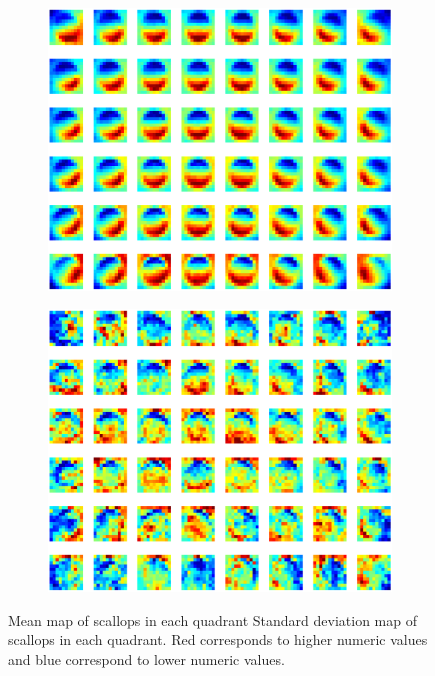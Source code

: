 \documentclass {udthesis}
\begin{document}
\begin{figure}
  \centering
  \begin{subfigure}[]{0.45\textwidth}
      \includegraphics[width=\textwidth]{mean_scallop_quadrants}
      \caption{}
      \label{subfig:mean_quadrant}
  \end{subfigure}
  \begin{subfigure}[]{0.45\textwidth}
      \includegraphics[width=\textwidth]{stddev_scallop_quadrants}        
      \caption{}
      \label{subfig:stddev_quadrant}
  \end{subfigure}
  \caption[Mean and variance map of scallops in each quadrant]{ Mean map of scallops in each quadrant  Standard deviation map of scallops in each quadrant.
  Red corresponds to higher numeric values and blue correspond to lower numeric values.}
  \label{fig:mean_stddev_quadrant}
\end{figure}
\end{document}
